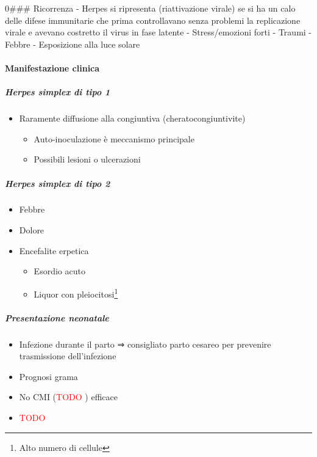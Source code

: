 \documentclass[italian,]{article}
\providecommand{\tightlist}{%
  \setlength{\itemsep}{0pt}\setlength{\parskip}{0pt}}
\newcommand{\TODO}[1]{\textcolor{red}{\textsf{\footnotesize{TODO #1}}}} %
\begin{document}
0\#\#\# Ricorrenza - Herpes si ripresenta (riattivazione virale) se si
ha un calo delle difese immunitarie che prima controllavano senza
problemi la replicazione virale e avevano costretto il virus in fase
latente - Stress/emozioni forti - Traumi - Febbre - Esposizione alla
luce solare

\hypertarget{manifestazione-clinica-2}{%
\paragraph{Manifestazione clinica}\label{manifestazione-clinica-2}}

\hypertarget{herpes-simplex-di-tipo-1}{%
\subparagraph{Herpes simplex di tipo 1}\label{herpes-simplex-di-tipo-1}}

\begin{itemize}
\tightlist
\item
  Raramente diffusione alla congiuntiva (cheratocongiuntivite)

  \begin{itemize}
  \tightlist
  \item
    Auto-inoculazione è meccanismo principale
  \item
    Possibili lesioni o ulcerazioni
  \end{itemize}
\end{itemize}

\hypertarget{herpes-simplex-di-tipo-2}{%
\subparagraph{Herpes simplex di tipo 2}\label{herpes-simplex-di-tipo-2}}

\begin{itemize}
\tightlist
\item
  Febbre
\item
  Dolore
\item
  Encefalite erpetica

  \begin{itemize}
  \tightlist
  \item
    Esordio acuto
  \item
    Liquor con pleiocitosi\footnote{Alto numero di cellule}
  \end{itemize}
\end{itemize}

\hypertarget{presentazione-neonatale}{%
\subparagraph{Presentazione neonatale}\label{presentazione-neonatale}}

\begin{itemize}
\item
  Infezione durante il parto ⇒ consigliato parto cesareo per prevenire
  trasmissione dell'infezione
\item
  Prognosi grama
\item
  No CMI (\TODO{}) efficace
\item
  \TODO{}
\end{itemize}
\end{document}
